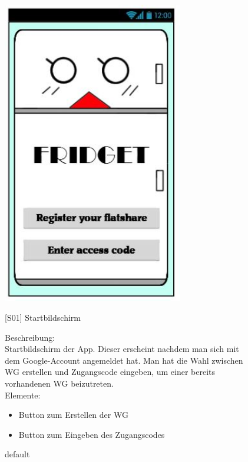 \documentclass[a4paper]{scrreprt}
\begin{document}
        \begin{figure}[h]
        	\begin{minipage}[b]{0.4\linewidth}
        		
        		\flushright
        		\centering
        		\includegraphics[width=0.7\textwidth]{fridget_start.JPG}
        		\caption{default}
        		\label{fig:figure1}
        	\end{minipage}
        	\hspace{0.5cm}
        	\begin{minipage}[b]{0.55\linewidth}
        		\flushleft
        		{[}S01{]} Startbildschirm 
        		
        		Beschreibung: \\
        		Startbildschirm der App. Dieser erscheint nachdem man sich mit dem Google-Account angemeldet hat. Man hat die Wahl zwischen WG erstellen und Zugangscode eingeben, um einer bereits vorhandenen WG beizutreten.
        		\\
        		Elemente:
        		\begin{itemize}
        		\renewcommand\labelitemi{--}
        		\item Button zum Erstellen der WG
        		\item Button zum Eingeben des Zugangscodes
        		\end{itemize}
        		

\end{minipage}
\end{figure}
\end{document}
